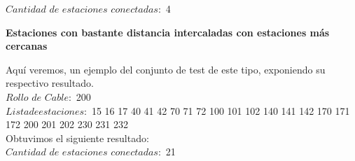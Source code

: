   $Cantidad$ $de$ $estaciones$ $conectadas:$ 4

\begin{center}
 \textbf{Estaciones con bastante distancia intercaladas con estaciones m\'as cercanas}
\end{center}

Aqu\'i veremos, un ejemplo del conjunto de test de este tipo, exponiendo su respectivo resultado.\\

\indent $Rollo$ $de$ $Cable:$ 200\\
$Lista de estaciones:$ 15 16 17  40 41 42 70 71 72 100 101 102 140 141 142 170 171 172 200 201 202 230 231 232\\

Obtuvimos el siguiente resultado:\\ 
  
  $Cantidad$ $de$ $estaciones$ $conectadas:$ 21
